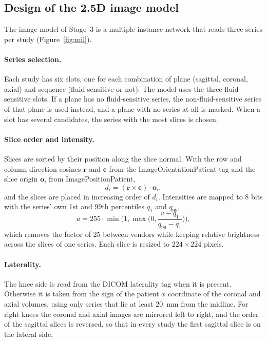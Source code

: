 \subsection{Design of the 2.5D image model}
\label{sec:design-mil}

The image model of Stage~3 is a multiple-instance network that reads three series per study (Figure~\ref{fig:mil}).

\paragraph{Series selection.} Each study has six slots, one for each combination of plane (sagittal, coronal, axial) and sequence (fluid-sensitive or not). The model uses the three fluid-sensitive slots. If a plane has no fluid-sensitive series, the non-fluid-sensitive series of that plane is used instead, and a plane with no series at all is masked. When a slot has several candidates, the series with the most slices is chosen.

\paragraph{Slice order and intensity.} Slices are sorted by their position along the slice normal. With the row and column direction cosines $\mathbf r$ and $\mathbf c$ from the ImageOrientationPatient tag and the slice origin $\mathbf o_i$ from ImagePositionPatient,
\begin{equation}
d_i = (\mathbf r \times \mathbf c)\cdot \mathbf o_i ,
\label{eq:sliceorder}
\end{equation}
and the slices are placed in increasing order of $d_i$. Intensities are mapped to 8 bits with the series' own 1st and 99th percentiles $q_{1}$ and $q_{99}$,
\begin{equation}
u = 255\cdot\min\!\Big(1,\max\!\Big(0,\frac{v-q_{1}}{q_{99}-q_{1}}\Big)\Big),
\label{eq:norm}
\end{equation}
which removes the factor of 25 between vendors while keeping relative brightness across the slices of one series. Each slice is resized to $224\times224$ pixels.

\paragraph{Laterality.} The knee side is read from the DICOM laterality tag when it is present. Otherwise it is taken from the sign of the patient $x$ coordinate of the coronal and axial volumes, using only series that lie at least 20~mm from the midline. For right knees the coronal and axial images are mirrored left to right, and the order of the sagittal slices is reversed, so that in every study the first sagittal slice is on the lateral side.

